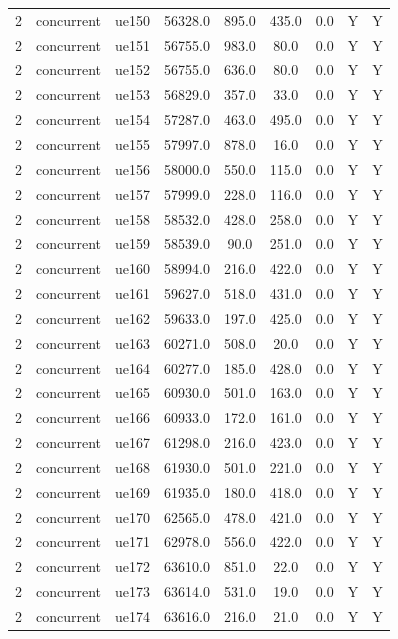 \begin{table}[ht]
\begin{tabular}{|c|c|c|c|c|c|c|c|c|}
2 & concurrent & ue150 & 56328.0 & 895.0 & 435.0 & 0.0 & Y & Y \\
2 & concurrent & ue151 & 56755.0 & 983.0 & 80.0 & 0.0 & Y & Y \\
2 & concurrent & ue152 & 56755.0 & 636.0 & 80.0 & 0.0 & Y & Y \\
2 & concurrent & ue153 & 56829.0 & 357.0 & 33.0 & 0.0 & Y & Y \\
2 & concurrent & ue154 & 57287.0 & 463.0 & 495.0 & 0.0 & Y & Y \\
2 & concurrent & ue155 & 57997.0 & 878.0 & 16.0 & 0.0 & Y & Y \\
2 & concurrent & ue156 & 58000.0 & 550.0 & 115.0 & 0.0 & Y & Y \\
2 & concurrent & ue157 & 57999.0 & 228.0 & 116.0 & 0.0 & Y & Y \\
2 & concurrent & ue158 & 58532.0 & 428.0 & 258.0 & 0.0 & Y & Y \\
2 & concurrent & ue159 & 58539.0 & 90.0 & 251.0 & 0.0 & Y & Y \\
2 & concurrent & ue160 & 58994.0 & 216.0 & 422.0 & 0.0 & Y & Y \\
2 & concurrent & ue161 & 59627.0 & 518.0 & 431.0 & 0.0 & Y & Y \\
2 & concurrent & ue162 & 59633.0 & 197.0 & 425.0 & 0.0 & Y & Y \\
2 & concurrent & ue163 & 60271.0 & 508.0 & 20.0 & 0.0 & Y & Y \\
2 & concurrent & ue164 & 60277.0 & 185.0 & 428.0 & 0.0 & Y & Y \\
2 & concurrent & ue165 & 60930.0 & 501.0 & 163.0 & 0.0 & Y & Y \\
2 & concurrent & ue166 & 60933.0 & 172.0 & 161.0 & 0.0 & Y & Y \\
2 & concurrent & ue167 & 61298.0 & 216.0 & 423.0 & 0.0 & Y & Y \\
2 & concurrent & ue168 & 61930.0 & 501.0 & 221.0 & 0.0 & Y & Y \\
2 & concurrent & ue169 & 61935.0 & 180.0 & 418.0 & 0.0 & Y & Y \\
2 & concurrent & ue170 & 62565.0 & 478.0 & 421.0 & 0.0 & Y & Y \\
2 & concurrent & ue171 & 62978.0 & 556.0 & 422.0 & 0.0 & Y & Y \\
2 & concurrent & ue172 & 63610.0 & 851.0 & 22.0 & 0.0 & Y & Y \\
2 & concurrent & ue173 & 63614.0 & 531.0 & 19.0 & 0.0 & Y & Y \\
2 & concurrent & ue174 & 63616.0 & 216.0 & 21.0 & 0.0 & Y & Y \\

\end{tabular}
\end{table}

